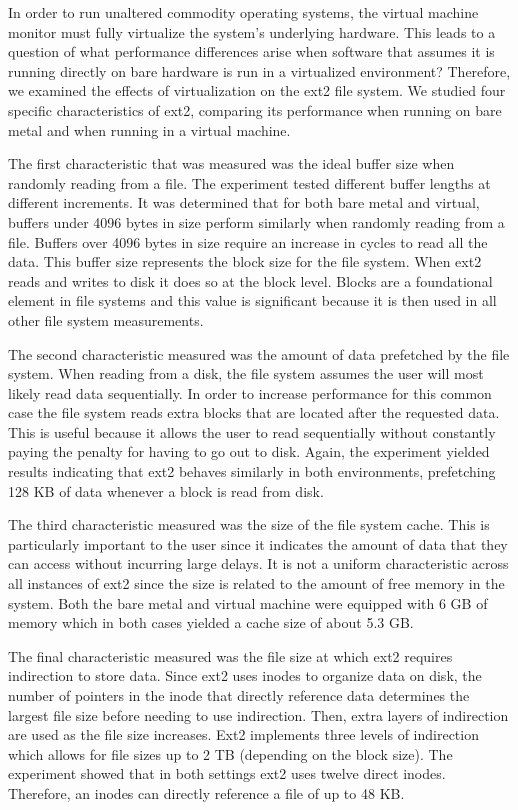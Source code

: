 \documentclass[letterpaper,twocolumn,10pt]{article}
\begin{document}
In order to run unaltered commodity operating systems, the virtual machine monitor must fully virtualize the system's underlying hardware.
This leads to a question of what performance differences arise when software that assumes it is running directly on bare hardware is run in a virtualized environment?
Therefore, we examined the effects of virtualization on the ext2 file system.
We studied four specific characteristics of ext2, comparing its performance when running on bare metal and when running in a virtual machine.

The first characteristic that was measured was the ideal buffer size when randomly reading from a file. 
The experiment tested different buffer lengths at different increments. 
It was determined that for both bare metal and virtual, buffers under 4096 bytes in size perform similarly when randomly reading from a file. 
Buffers over 4096 bytes in size require an increase in cycles to read all the data. 
This buffer size represents the block size for the file system. 
When ext2 reads and writes to disk it does so at the block level.
Blocks are a foundational element in file systems and this value is significant because it is then used in all other file system measurements.

The second characteristic measured was the amount of data prefetched by the file system. 
When reading from a disk, the file system assumes the user will most likely read data sequentially. 
In order to increase performance for this common case the file system reads extra blocks that are located after the requested data. 
This is useful because it allows the user to read sequentially without constantly paying the penalty for having to go out to disk. 
Again, the experiment yielded results indicating that ext2 behaves similarly in both environments, prefetching 128 KB of data whenever a block is read from disk.

The third characteristic measured was the size of the file system cache. 
This is particularly important to the user since it indicates the amount of data that they can access without incurring large delays. 
It is not a uniform characteristic across all instances of ext2 since the size is related to the amount of free memory in the system.
Both the bare metal and virtual machine were equipped with 6 GB of memory which in both cases yielded a cache size of about 5.3 GB. 

The final characteristic measured was the file size at which ext2 requires indirection to store data. 
Since ext2 uses inodes to organize data on disk, the number of pointers in the inode that directly reference data determines the largest file size before needing to use indirection. 
Then, extra layers of indirection are used as the file size increases. 
Ext2 implements three levels of indirection which allows for file sizes up to 2 TB (depending on the block size). 
The experiment showed that in both settings ext2 uses twelve direct inodes. 
Therefore, an inodes can directly reference a file of up to 48 KB. 
\end{document}
